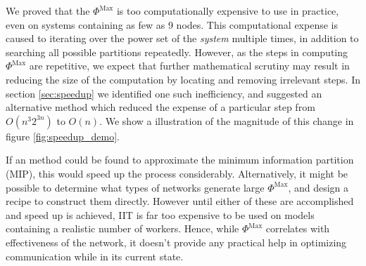 We proved that the $\Phi^\text{Max}$ is too computationally expensive to use in practice, even on systems containing as few as 9 nodes. This computational expense is caused to iterating over the power set of the \textit{system} multiple times, in addition to searching all possible partitions repeatedly. However, as the steps in computing $\Phi^\text{Max}$ are repetitive, we expect that further mathematical scrutiny may result in reducing the size of the computation by locating and removing irrelevant steps. In section \ref{sec:speedup} we identified one such inefficiency, and suggested an alternative method which reduced the expense of a particular step from $O(n^3 2^{3n})$ to $O(n)$. We show a illustration of the magnitude of this change in figure \ref{fig:speedup_demo}.

If an  method could be found to approximate the minimum information partition (MIP), this would speed up the process considerably. Alternatively, it might be possible to determine what types of networks generate large $\Phi^\text{Max}$, and design a recipe to construct them directly. However until either of these are accomplished and speed up is achieved, IIT is far too expensive to be used on models containing a realistic number of workers. Hence, while $\Phi^\text{Max}$ correlates with effectiveness of the network, it doesn't provide any practical help in optimizing communication while in its current state.



